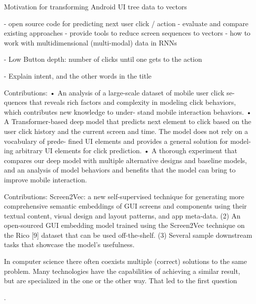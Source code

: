 Motivation for transforming Android UI tree data to vectors

- open source code for predicting next user click / action
- evaluate and compare existing approaches
- provide tools to reduce screen sequences to vectors
- how to work with multidimensional (multi-modal) data in RNNs

- Low Button depth: number of clicks until one gets to the action \cite{lee2018click}

- Explain intent, and the other words in the title

Contributions: \cite{zhou2021large}
• An analysis of a large-scale dataset of mobile user click se-
quences that reveals rich factors and complexity in modeling
click behaviors, which contributes new knowledge to under-
stand mobile interaction behaviors.
• A Transformer-based deep model that predicts next element
to click based on the user click history and the current screen
and time. The model does not rely on a vocabulary of prede-
fined UI elements and provides a general solution for model-
ing arbitrary UI elements for click prediction.
• A thorough experiment that compares our deep model with
multiple alternative designs and baseline models, and an
analysis of model behaviors and benefits that the model can
bring to improve mobile interaction.

Contributions: \cite{li2021screen2vec}
Screen2Vec: a new self-supervised technique for generating
more comprehensive semantic embeddings of GUI screens
and components using their textual content, visual design
and layout patterns, and app meta-data.
(2) An open-sourced GUI embedding model trained using the
Screen2Vec technique on the Rico [9] dataset that can be
used off-the-shelf.
(3) Several sample downstream tasks that showcase the model’s
usefulness.

In computer science there often coexists multiple (correct) solutions to the same problem.
Many technologies have the capabilities of achieving a similar result, but are specialized in the one or the other way.
That led to the first question

.



\label{subsec:motivation}





